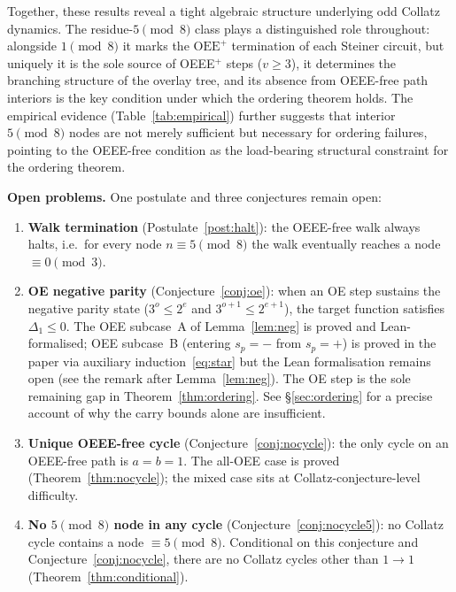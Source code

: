 \documentclass[11pt]{article}
\begin{document}
Together, these results reveal a tight algebraic structure underlying odd
Collatz dynamics.  The residue-$5\pmod{8}$ class plays a distinguished role
throughout: alongside $1\pmod{8}$ it marks the $\mathrm{OEE}^+$ termination
of each Steiner circuit, but uniquely it is the sole source of OEEE$^+$ steps
($v\geq 3$), it determines the branching structure of the overlay tree, and
its absence from OEEE-free path interiors is the key condition under which the
ordering theorem holds.  The empirical evidence (Table~\ref{tab:empirical})
further suggests that interior $5\pmod{8}$ nodes are not merely sufficient
but necessary for ordering failures, pointing to the OEEE-free condition as
the load-bearing structural constraint for the ordering theorem.

\medskip
\noindent\textbf{Open problems.}  One postulate and three conjectures remain
open:

\begin{enumerate}
  \item \textbf{Walk termination} (Postulate~\ref{post:halt}):
        the OEEE-free walk always halts, i.e.\ for every node
        $n \equiv 5\pmod{8}$ the walk eventually reaches a node
        $\equiv 0\pmod{3}$.

  \item \textbf{OE negative parity} (Conjecture~\ref{conj:oe}):
        when an OE step sustains the negative parity state
        ($3^o \leq 2^e$ and $3^{o+1} \leq 2^{e+1}$), the target function
        satisfies $\Delta_1 \leq 0$.  The OEE subcase~A of
        Lemma~\ref{lem:neg} is proved and Lean-formalised; OEE subcase~B
        (entering $s_p=-$ from $s_p=+$) is proved in the paper via
        auxiliary induction~\eqref{eq:star} but the Lean formalisation
        remains open (see the remark after Lemma~\ref{lem:neg}).
        The OE step is the sole remaining gap in Theorem~\ref{thm:ordering}.
        See \S\ref{sec:ordering} for a precise account of why the carry
        bounds alone are insufficient.

  \item \textbf{Unique OEEE-free cycle} (Conjecture~\ref{conj:nocycle}):
        the only cycle on an OEEE-free path is $a = b = 1$.  The all-OEE
        case is proved (Theorem~\ref{thm:nocycle}); the mixed case sits at
        Collatz-conjecture-level difficulty.

  \item \textbf{No $5\pmod{8}$ node in any cycle} (Conjecture~\ref{conj:nocycle5}):
        no Collatz cycle contains a node $\equiv 5\pmod{8}$.
        Conditional on this conjecture and Conjecture~\ref{conj:nocycle},
        there are no Collatz cycles other than $1\to 1$
        (Theorem~\ref{thm:conditional}).
\end{enumerate}
\end{document}
